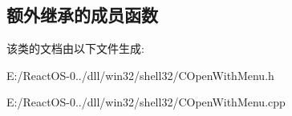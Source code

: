 \subsection*{额外继承的成员函数}


该类的文档由以下文件生成\+:\begin{DoxyCompactItemize}
\item 
E\+:/\+React\+O\+S-\/0../dll/win32/shell32/C\+Open\+With\+Menu.\+h\item 
E\+:/\+React\+O\+S-\/0../dll/win32/shell32/C\+Open\+With\+Menu.\+cpp\end{DoxyCompactItemize}
